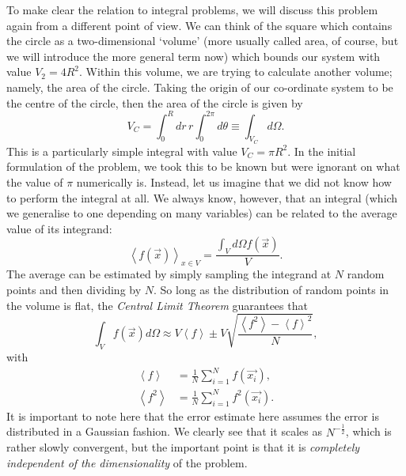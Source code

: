 To make clear the relation to integral problems, we will discuss this problem again from a different point of view. We can think of the square which contains the circle as a two-dimensional `volume' (more usually called area, of course, but we will introduce the more general term now) which bounds our system with value $V_2 = 4 R^2$. Within this volume, we are trying to calculate another volume; namely, the area of the circle. Taking the origin of our co-ordinate system to be the centre of the circle, then the area of the circle is given by
\begin{equation}
V_C = \int_0^R dr \hspace{2pt} r \int_0^{2 \pi} d \theta \equiv \int_{V_C} d \Omega.
\end{equation}
This is a particularly simple integral with value $V_C = \pi R^2$. In the initial formulation of the problem, we took this to be known but were ignorant on what the value of $\pi$ numerically is. Instead, let us imagine that we did not know how to perform the integral at all. We always know, however, that an integral (which we generalise to one depending on many variables) can be related to the average value of its integrand:
\begin{equation}
\left< f(\vec{x}) \right>_{x \in V} = \frac{\int_V d \Omega f(\vec{x})}{V}.
\end{equation}
The average can be estimated by simply sampling the integrand at $N$ random points and then dividing by $N$. So long as the distribution of random points in the volume is flat, the \emph{Central Limit Theorem} guarantees that
\begin{equation}
\int_V f(\vec{x}) d \Omega \approx V \left<f \right> \pm V \sqrt{\frac{\left<f^2 \right> - \left<f \right>^2}{N}},
\label{eqn:mcmaster}
\end{equation}
with
\begin{subequations}
\begin{align}
\left<f \right> &= \frac{1}{N} \sum_{i=1}^{N} f(\vec{x_i}), \\
\left<f^2 \right> &= \frac{1}{N} \sum_{i=1}^{N} f^2(\vec{x_i}).
\end{align}
\end{subequations}
It is important to note here that the error estimate here assumes the error is distributed in a Gaussian fashion. We clearly see that it scales as $N^{-\frac{1}{2}}$, which is rather slowly convergent, but the important point is that it is \emph{completely independent of the dimensionality} of the problem.  

